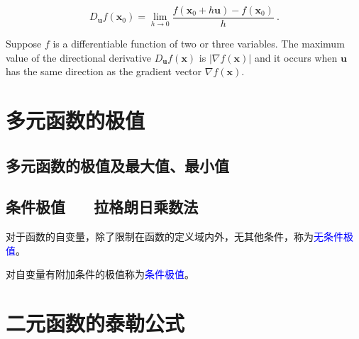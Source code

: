 \documentclass[12pt,a4paper]{article}
\renewcommand{\vec}[1]{\boldsymbol{#1}}
\begin{document}
\begin{equation}
D_{\vec{u}} f(\vec{x}_0) = \underset{h \rightarrow 0}\lim \dfrac{f(\vec{x}_0 +h \vec{u}) -f(\vec{x}_0)}{h} ~.
\end{equation}


\begin{tcolorbox}[colback=green!5,colframe=green!40!black,title= Theorem]
Suppose $f$ is a differentiable function of two or three variables. The maximum value of the directional derivative $D_{\vec{u}} f(\vec{x})$ is $|\nabla f (\vec{x})|$ and it occurs when $\vec{u}$ has the same direction as the gradient vector $\nabla f(\vec{x})$.
\end{tcolorbox}

\section{多元函数的极值}

\subsection{多元函数的极值及最大值、最小值}







\subsection{条件极值 ~~ 拉格朗日乘数法}
对于函数的自变量，除了限制在函数的定义域内外，无其他条件，称为\textcolor{blue}{无条件极值}。

对自变量有附加条件的极值称为\textcolor{blue}{条件极值}。
















\section{二元函数的泰勒公式}
\end{document}
